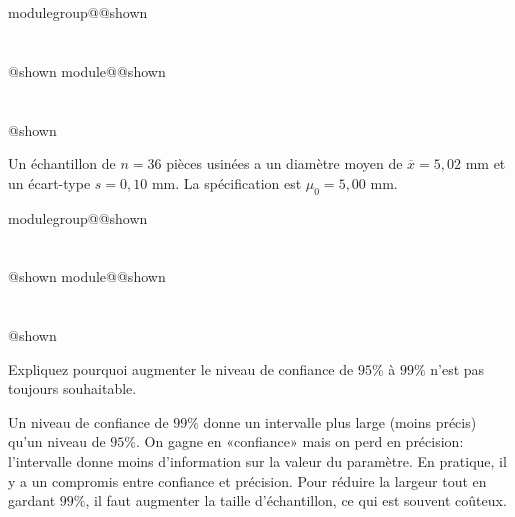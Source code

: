 \documentclass{Evaluation}
\makeatletter
\newcommand{\currentmodulekey}{}
\newcommand{\currentmoduletitle}{}
\newcommand{\currentgroupkey}{}
\newcommand{\currentgrouptitle}{}
\newcommand{\showmoduleifneeded}{%
  \ifx\currentgroupkey\empty\else
    \expandafter\ifx\csname modulegroup@\currentgroupkey @shown\endcsname\relax
      \section*{\currentgrouptitle}%
      \expandafter\gdef\csname modulegroup@\currentgroupkey @shown\endcsname{1}%
    \fi
  \fi
  \expandafter\ifx\csname module@\currentmodulekey @shown\endcsname\relax
    \section*{\currentmoduletitle}%
    \expandafter\gdef\csname module@\currentmodulekey @shown\endcsname{1}%
  \fi
}
\newenvironment{A25}{\showmoduleifneeded}{}
\makeatother
\begin{document}
\begin{questions}
\begin{A25}
\question Un échantillon de $n=36$ pièces usinées a un diamètre moyen de $\overline{x}=5{,}02$ mm et un écart-type $s=0{,}10$ mm. La spécification est $\mu_0=5{,}00$ mm.

\end{A25}

\begin{A25}
\question Expliquez pourquoi augmenter le niveau de confiance de $95\%$ à $99\%$ n'est pas toujours souhaitable.

\begin{solution}
    Un niveau de confiance de $99\%$ donne un intervalle plus large (moins précis) qu'un niveau de $95\%$. On gagne en «confiance» mais on perd en précision: l'intervalle donne moins d'information sur la valeur du paramètre. En pratique, il y a un compromis entre confiance et précision. Pour réduire la largeur tout en gardant $99\%$, il faut augmenter la taille d'échantillon, ce qui est souvent coûteux.
\end{solution}
\end{A25}



\end{questions}
\end{document}
